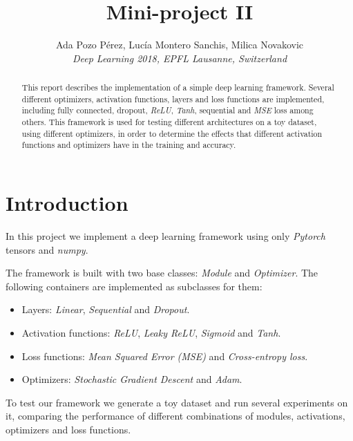 \documentclass[10pt,conference,compsocconf]{IEEEtran}
\begin{document}
\title{Mini-project II}

\author{
  Ada Pozo P\'{e}rez, Luc\'{i}a Montero Sanchis, Milica Novakovic\\
  \textit{Deep Learning 2018, EPFL Lausanne, Switzerland}
}

\maketitle

\begin{abstract}
  This report describes the implementation of a simple deep learning framework. Several different optimizers, activation functions, layers and loss functions are implemented, including fully connected, dropout, \textit{ReLU}, \textit{Tanh}, sequential and \textit{MSE} loss among others. This framework is used for testing different architectures on a toy dataset, using different optimizers, in order to determine the effects that different activation functions and optimizers have in the training and accuracy.
\end{abstract}

\section{Introduction}
	In this project we implement a deep learning framework using only \textit{Pytorch} tensors and \textit{numpy}.
	
	The framework is built with two base classes: \textit{Module} and \textit{Optimizer}. The following containers are implemented as subclasses for them:
	
	\begin{itemize}
	    \item Layers: \textit{Linear}, \textit{Sequential} and \textit{Dropout}.
	    \item Activation functions: \textit{ReLU}, \textit{Leaky ReLU}, \textit{Sigmoid} and \textit{Tanh}.
	    \item Loss functions: \textit{Mean Squared Error (MSE)} and \textit{Cross-entropy loss}.
	    \item Optimizers: \textit{Stochastic Gradient Descent} and \textit{Adam}.
	\end{itemize}
	
    To test our framework we generate a toy dataset and run several experiments on it, comparing the performance of different combinations of modules, activations, optimizers and loss functions.
    
\end{document}
